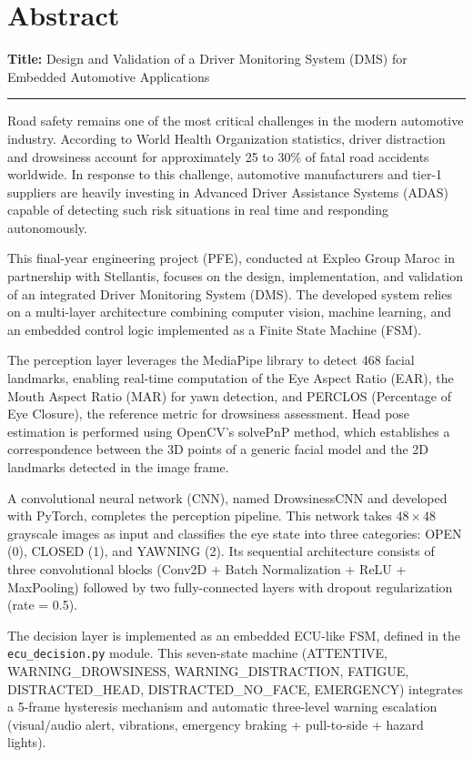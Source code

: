 \documentclass[12pt,a4paper]{report}
\begin{document}
\chapter*{Abstract}
\thispagestyle{fancy}

\noindent\textbf{Title:} Design and Validation of a Driver Monitoring System (DMS) for Embedded Automotive Applications

\noindent\rule{\linewidth}{0.5pt}
\vspace{0.3cm}

Road safety remains one of the most critical challenges in the modern automotive industry. According to World Health Organization statistics, driver distraction and drowsiness account for approximately 25 to 30\% of fatal road accidents worldwide. In response to this challenge, automotive manufacturers and tier-1 suppliers are heavily investing in Advanced Driver Assistance Systems (ADAS) capable of detecting such risk situations in real time and responding autonomously.

This final-year engineering project (PFE), conducted at Expleo Group Maroc in partnership with Stellantis, focuses on the design, implementation, and validation of an integrated Driver Monitoring System (DMS). The developed system relies on a multi-layer architecture combining computer vision, machine learning, and an embedded control logic implemented as a Finite State Machine (FSM).

The perception layer leverages the MediaPipe library to detect 468 facial landmarks, enabling real-time computation of the Eye Aspect Ratio (EAR), the Mouth Aspect Ratio (MAR) for yawn detection, and PERCLOS (Percentage of Eye Closure), the reference metric for drowsiness assessment. Head pose estimation is performed using OpenCV's solvePnP method, which establishes a correspondence between the 3D points of a generic facial model and the 2D landmarks detected in the image frame.

A convolutional neural network (CNN), named DrowsinessCNN and developed with PyTorch, completes the perception pipeline. This network takes $48\times48$ grayscale images as input and classifies the eye state into three categories: OPEN (0), CLOSED (1), and YAWNING (2). Its sequential architecture consists of three convolutional blocks (Conv2D + Batch Normalization + ReLU + MaxPooling) followed by two fully-connected layers with dropout regularization (rate = 0.5).

The decision layer is implemented as an embedded ECU-like FSM, defined in the \texttt{ecu\_decision.py} module. This seven-state machine (ATTENTIVE, WARNING\_DROWSINESS, WARNING\_DISTRACTION, FATIGUE, DISTRACTED\_HEAD, DISTRACTED\_NO\_FACE, EMERGENCY) integrates a 5-frame hysteresis mechanism and automatic three-level warning escalation (visual/audio alert, vibrations, emergency braking + pull-to-side + hazard lights).
\end{document}

